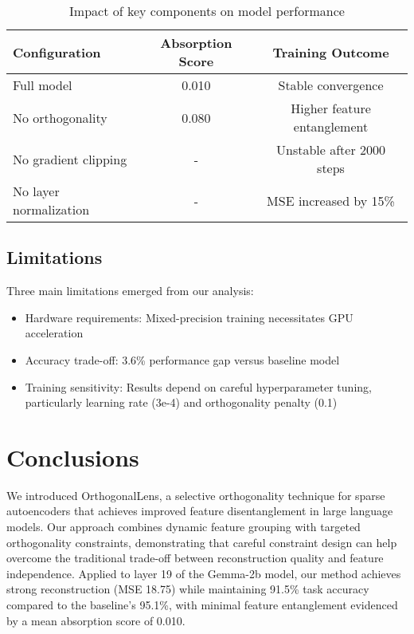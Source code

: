 \documentclass{article} %
\begin{document}
\begin{table}[h]
\centering
\begin{tabular}{lcc}
\toprule
Configuration & Absorption Score & Training Outcome \\
\midrule
Full model & 0.010 & Stable convergence \\
No orthogonality & 0.080 & Higher feature entanglement \\
No gradient clipping & - & Unstable after 2000 steps \\
No layer normalization & - & MSE increased by 15\% \\
\bottomrule
\end{tabular}
\caption{Impact of key components on model performance}
\label{tab:ablation}
\end{table}

\subsection{Limitations}

Three main limitations emerged from our analysis:
\begin{itemize}
    \item Hardware requirements: Mixed-precision training necessitates GPU acceleration
    \item Accuracy trade-off: 3.6\% performance gap versus baseline model
    \item Training sensitivity: Results depend on careful hyperparameter tuning, particularly learning rate (3e-4) and orthogonality penalty (0.1)
\end{itemize}





\section{Conclusions}
\label{sec:conclusion}

We introduced OrthogonalLens, a selective orthogonality technique for sparse autoencoders that achieves improved feature disentanglement in large language models. Our approach combines dynamic feature grouping with targeted orthogonality constraints, demonstrating that careful constraint design can help overcome the traditional trade-off between reconstruction quality and feature independence. Applied to layer 19 of the Gemma-2b model, our method achieves strong reconstruction (MSE 18.75) while maintaining 91.5\% task accuracy compared to the baseline's 95.1\%, with minimal feature entanglement evidenced by a mean absorption score of 0.010.
\end{document}
